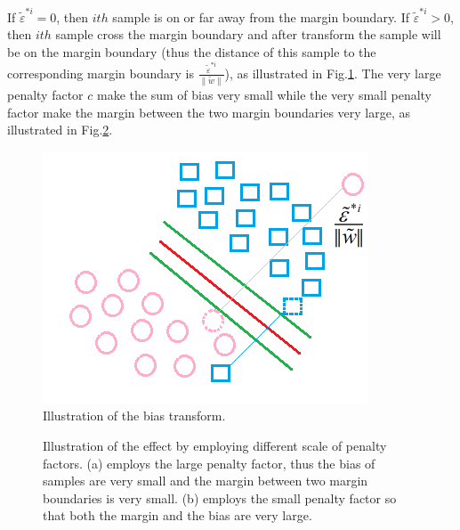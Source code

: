 \documentclass[runningheads,openany]{xhlPaper}
\begin{document}
If ${{\tilde \varepsilon }^{*i}} = 0$, then $ith$ sample is on or far away from the margin boundary. If ${{\tilde \varepsilon }^{*i}} > 0$, then $ith$ sample cross the margin boundary and after transform the sample will be on the margin boundary (thus the distance of this sample to the corresponding margin boundary is $\frac{{{{\tilde \varepsilon }^{*i}}}}{{\parallel \tilde w\parallel }}$), as illustrated in Fig.\ref{fig:svmSoftDistance}. The very large penalty factor $c$ make the sum of bias very small while the very small penalty factor make the margin between the two margin boundaries very large, as illustrated in Fig.\ref{fig:svmSoftPenaltyEffect}.

\begin{figure}
\centering
\includegraphics[width=0.5\linewidth]{svmSoftDistance}
\caption{Illustration of the bias transform.}
\label{fig:svmSoftDistance}
\end{figure}

\begin{figure}
\centering
{}
\caption{Illustration of the effect by employing different scale of penalty factors. (a) employs the large penalty factor, thus the bias of samples are very small and the margin between two margin boundaries is very small. (b) employs the small penalty factor so that both the margin and the bias are very large.}
\label{fig:svmSoftPenaltyEffect}
\end{figure}
\end{document}
